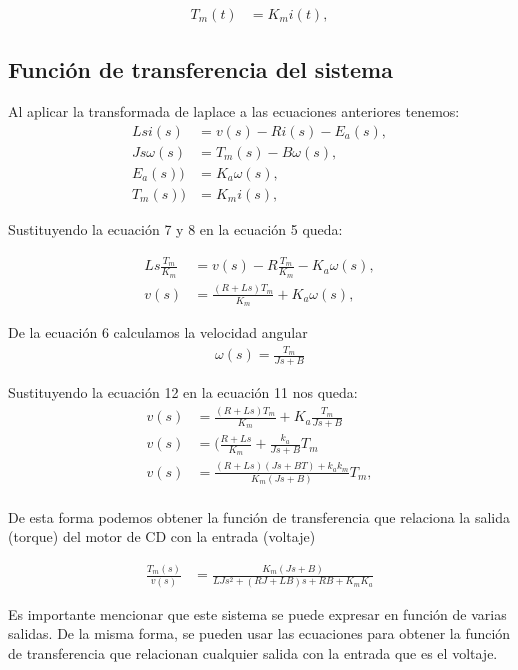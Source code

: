 \documentclass[journal]{IEEEtran}
\begin{document}
\begin{align}
T_m(t) &= K_m i(t),
\end{align}

\subsection{Función de transferencia del sistema}

Al aplicar la transformada de laplace a las ecuaciones anteriores tenemos:
\begin{align}
Lsi(s) &= v(s)-Ri(s)-E_a(s), \\
Js\omega(s) &= T_m(s)-B\omega(s), \\
E_a(s)) &=K_a\omega(s), \\
T_m(s)) &=K_mi(s), 
\end{align}

Sustituyendo la ecuación 7 y 8 en la ecuación 5 queda:

\begin{align}
Ls\frac{T_m}{K_m} &= v(s)-R\frac{T_m}{K_m}-K_a\omega(s), \\
v(s)&=\frac{(R+Ls)T_m}{K_m}+K_a\omega(s),
\end{align}

De la ecuación 6 calculamos la velocidad angular
\begin{align}
\omega(s)=\frac{T_m}{Js+B}
\end{align}

Sustituyendo la ecuación 12 en la ecuación 11 nos queda:\\
\begin{align}
v(s)&=\frac{(R+Ls)T_m}{K_m}+K_a\frac{T_m}{Js+B}\\
v(s)&=(\frac{R+Ls}{K_m}+\frac{k_a}{Js+B}T_m\\
v(s)&=\frac{(R+Ls)(Js+BT)+k_a k_m}{K_m(Js+B)}T_m,
\end{align}
\\
De esta forma podemos obtener la función de transferencia que relaciona la salida (torque)  del motor de CD con la entrada (voltaje)

\begin{align}
\frac{T_m(s)}{v(s)}&=\frac{K_m(Js+B)}{LJs^2+(RJ+LB)s+RB+K_m K_a}
\end{align}

Es importante mencionar que este sistema se puede expresar en función de varias salidas. De la misma forma, se pueden usar las ecuaciones para obtener la función de transferencia que relacionan cualquier salida con la entrada que es el voltaje.
\end{document}
